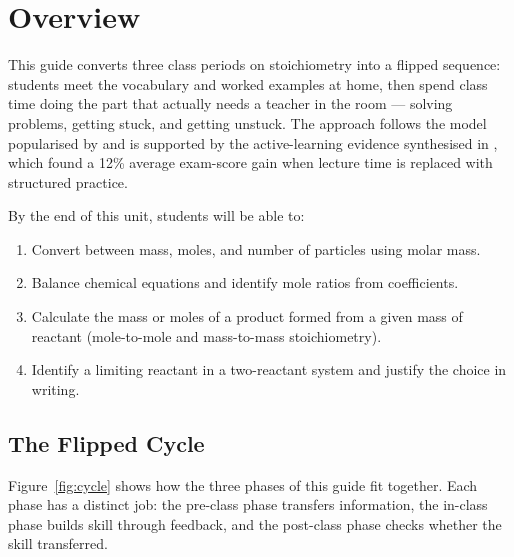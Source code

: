 \section{Overview}

This guide converts three class periods on stoichiometry into a flipped
sequence: students meet the vocabulary and worked examples at home, then
spend class time doing the part that actually needs a teacher in the room
--- solving problems, getting stuck, and getting unstuck. The approach
follows the model popularised by \citet{bergmann2012flip} and is
supported by the active-learning evidence synthesised in
\citet{freeman2014active}, which found a 12\% average exam-score gain
when lecture time is replaced with structured practice.

\begin{objectivebox}
By the end of this unit, students will be able to:
\begin{enumerate}[label=\arabic*.]
  \item Convert between mass, moles, and number of particles using molar mass.
  \item Balance chemical equations and identify mole ratios from coefficients.
  \item Calculate the mass or moles of a product formed from a given mass of reactant (mole-to-mole and mass-to-mass stoichiometry).
  \item Identify a limiting reactant in a two-reactant system and justify the choice in writing.
\end{enumerate}
\end{objectivebox}

\subsection*{The Flipped Cycle}

Figure~\ref{fig:cycle} shows how the three phases of this guide fit
together. Each phase has a distinct job: the pre-class phase transfers
information, the in-class phase builds skill through feedback, and the
post-class phase checks whether the skill transferred.

